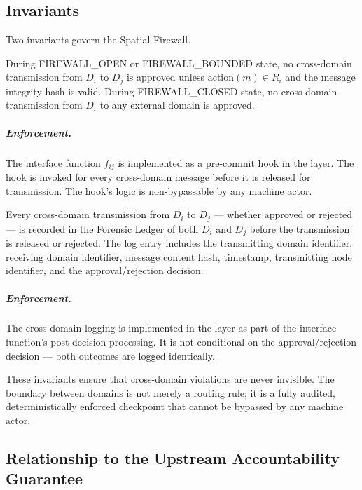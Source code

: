 \subsection{Invariants}\label{sec:firewall-invariants}

Two invariants govern the Spatial Firewall.

\begin{invariant}\label{inv:domain-isolation}
During FIREWALL\_OPEN or FIREWALL\_BOUNDED state, no cross-domain transmission from $D_i$ to $D_j$ is approved unless $\text{action}(m) \in R_i$ and the message integrity hash is valid. During FIREWALL\_CLOSED state, no cross-domain transmission from $D_i$ to any external domain is approved.
\end{invariant}

\subparagraph{Enforcement.} The interface function $f_{ij}$ is implemented as a pre-commit hook in the \fact{} layer. The hook is invoked for every cross-domain message before it is released for transmission. The hook's logic is non-bypassable by any machine actor.

\begin{invariant}\label{inv:xdomain-logging}
Every cross-domain transmission from $D_i$ to $D_j$ — whether approved or rejected — is recorded in the Forensic Ledger of both $D_i$ and $D_j$ before the transmission is released or rejected. The log entry includes the transmitting domain identifier, receiving domain identifier, message content hash, timestamp, transmitting node identifier, and the approval/rejection decision.
\end{invariant}

\subparagraph{Enforcement.} The cross-domain logging is implemented in the \fact{} layer as part of the interface function's post-decision processing. It is not conditional on the approval/rejection decision — both outcomes are logged identically.

These invariants ensure that cross-domain violations are never invisible. The boundary between domains is not merely a routing rule; it is a fully audited, deterministically enforced checkpoint that cannot be bypassed by any machine actor.

\subsection{Relationship to the Upstream Accountability Guarantee}\label{sec:firewall-uag}

